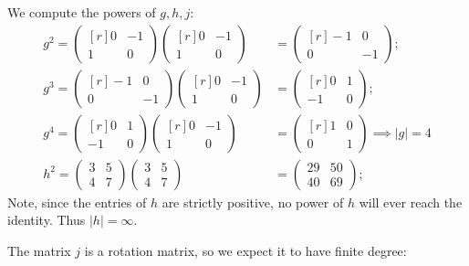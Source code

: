 \documentclass[../algebraNotesMSRI-UP2016.tex]{subfiles}
\begin{document}
\answerKey
\begin{frame}{\subsecname}
We compute the powers of $g,h,j$:
\begin{align*}
g^2=\begin{pmatrix*}[r]
	0 & -1 \\
	1 & 0 \end{pmatrix*}
	\begin{pmatrix*}[r]
	0 & -1 \\
	1 & 0 \end{pmatrix*}
	&= \begin{pmatrix*}[r]
	-1 & 0 \\
	0 & -1 
	\end{pmatrix*}; \\
g^3=\begin{pmatrix*}[r]
	-1 & 0 \\
	0 & -1 \end{pmatrix*}
	\begin{pmatrix*}[r]
	0 & -1 \\
	1 & 0 \end{pmatrix*}
	&= \begin{pmatrix*}[r]
	0 & 1 \\
	-1 & 0 
	\end{pmatrix*}; \\
g^4 = \begin{pmatrix*}[r]
	0 & 1 \\
	-1 & 0 \end{pmatrix*}
	\begin{pmatrix*}[r]
	0 & -1 \\
	1 & 0 
	\end{pmatrix*}
	&= \begin{pmatrix*}[r]
	1 & 0 \\
	0 & 1
	\end{pmatrix*} \implies \boxed{|g|=4} \\
h^2=\begin{pmatrix}
	3 & 5 \\
	4 & 7 
	\end{pmatrix}
	\begin{pmatrix}
	3 & 5 \\
	4 & 7
	\end{pmatrix}
	&= \begin{pmatrix}
	29 & 50 \\
	40 & 69
	\end{pmatrix};
\end{align*}
Note, since the entries of $h$ are strictly positive, no power of $h$ will ever reach the identity.  Thus $\boxed{|h|=\infty}$.

\smallGap
The matrix $j$ is a rotation matrix, so we expect it to have finite degree:
\end{frame}
\end{document}
